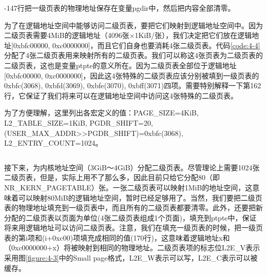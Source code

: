 \documentclass[main.tex]{subfiles}
\begin{document}
\begin{CJK*}{UTF8}{song}
\begin{code}
\label{code:4-3}
\inputminted[firstline=137,lastline=149,linenos,numbersep=5pt,frame=lines,framesep=2mm]{c}{src/chapter04/kernel/machdep.c}
\end{code}

-147行把一级页表的物理地址保存在变量pgdir中，然后把内容全部清零。

\par
为了在逻辑地址空间中能够访问二级页表，要把它们映射到逻辑地址空间中。因为二级页表需要4MiB的逻辑地址（4096张$\times$1KiB/张），我们决定把它们放在逻辑地址[0xbfc00000, 0xc0000000]，而且它们自身也要消耗4张二级页表。代码\ref{code:4-4}分配了4张二级页表用来映射所有的二级页表。我们可以称这4张页表为二级页表的二级页表，这也是变量ptpte的意义所在。因为二级页表全部位于逻辑地址[0xbfc00000, 0xc0000000]，因此这4张特殊的二级页表应该分别被填到一级页表的0xbfc(3068), 0xbfd(3069), 0xbfe(3070), 0xbff(3071)四项。需要特别解释一下第162行，它保证了我们将来可以在逻辑地址空间中访问这4张特殊的二级页表。

\par
为了方便理解，这里列出各宏定义的值：PAGE\_SIZE=4KiB, L2\_TABLE\_SIZE=1KiB, PGDR\_SHIFT=20, (USER\_MAX\_ADDR\textgreater\textgreater PGDR\_SHIFT)=0xbfc(3068), L2\_ENTRY\_COUNT=1024。

\begin{code}
\label{code:4-4}
\inputminted[firstline=151,lastline=162,linenos,numbersep=5pt,frame=lines,framesep=2mm]{c}{src/chapter04/kernel/machdep.c}
\end{code}

接下来，为内核地址空间（3GiB～4GiB）分配二级页表。尽管理论上需要1024张二级页表，但是，实际上用不了那么多，因此目前只给它分配80（即NR\_KERN\_PAGETABLE）张。一张二级页表可以映射1MiB的地址空间，这意味着可以映射80MiB的逻辑地址空间，暂时已经足够用了。当然，我们要把二级页表的物理地址填充到一级页表中，而且所有的二级页表都要清零。此外，还要把新分配的二级页表以页面为单位(4张二级页表组成1个页面)，填充到ptpte中，保证将来用逻辑地址可以访问二级页表。注意，我们在填充一级页表的时候，把一级页表的第i项和(i+0xc00)项填充成相同的值(170行)，这意味着逻辑地址x和（0xc0000000+x）将被映射到相同的物理地址。二级页表项的标志位L2E\_V表示采用图\ref{figure:4-3}中的Small page格式，L2E\_W表示可以写，L2E\_C表示可以被缓存。

\begin{code}
\label{code:4-5}
\inputminted[firstline=164,lastline=176,linenos,numbersep=5pt,frame=lines,framesep=2mm]{c}{src/chapter04/kernel/machdep.c}
\end{code}


\end{CJK*}
\end{document}
